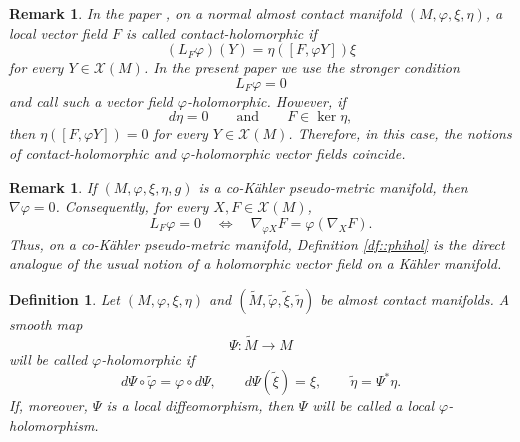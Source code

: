 \documentclass[12pt,a4paper,final]{amsart}
\numberwithin{equation}{section}
\newtheorem{uw}[tw]{Remark}
\theoremstyle{df}
\newtheorem{df}[tw]{Definition}
\newcommand{\X}{\mathcal{X}}
\newcommand{\XM}{\X(M)}
\begin{document}
\begin{uw}\label{uw::phihol}
In the paper \cite{BS}, on a normal almost contact manifold
$(M,\varphi,\xi,\eta)$, a local vector field $F$ is called
\emph{contact-holomorphic} if
$$
(L_F\varphi)(Y)=\eta([F,\varphi Y])\xi
$$
for every $Y\in\XM$.
In the present paper we use the stronger condition
$$
L_F\varphi=0
$$
and call such a vector field $\varphi$-holomorphic. However, if
$$
d\eta=0
\qquad\text{and}\qquad
F\in\ker\eta,
$$
then $\eta([F,\varphi Y])=0$ for every $Y\in\XM$. Therefore, in this case, the notions of
contact-holomorphic and $\varphi$-holomorphic vector fields coincide.
\end{uw}

\begin{uw}\label{uw::phihol::cok}
If $(M,\varphi,\xi,\eta,g)$ is a co-K\"ahler pseudo-metric manifold, then
$\nabla\varphi=0$. Consequently, for every $X, F\in\XM$,
$$
L_F\varphi=0\quad \Leftrightarrow \quad \nabla_{\varphi X}F=\varphi(\nabla_XF).
$$
Thus, on a co-K\"ahler pseudo-metric manifold, Definition
\ref{df::phihol} is the direct analogue of the usual notion of a holomorphic
vector field on a K\"ahler manifold.
\end{uw}


\begin{df}\label{df::phiholmap}
Let $(M,\varphi,\xi,\eta)$ and $(\widetilde M,\widetilde\varphi,\widetilde\xi,\widetilde\eta)$
be almost contact manifolds. A smooth map
$$
\Psi:\widetilde M\to M
$$
will be called \emph{$\varphi$-holomorphic} if
\begin{equation}\label{eq::phiholmap}
d\Psi\circ \widetilde\varphi=\varphi\circ d\Psi,
\qquad
d\Psi(\widetilde\xi)=\xi,
\qquad
\widetilde\eta=\Psi^\ast\eta.
\end{equation}
If, moreover, $\Psi$ is a local diffeomorphism, then $\Psi$ will be called a
\emph{local $\varphi$-holomorphism}.
\end{df}
\end{document}
